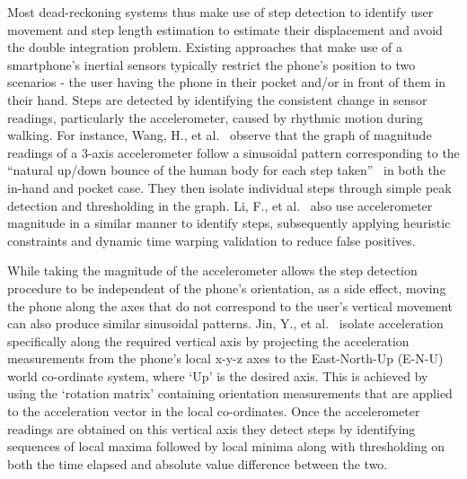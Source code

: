 \documentclass[main.tex]{subfiles}
\begin{document}
Most dead-reckoning systems thus make use of step detection to identify user movement and step length estimation to estimate their displacement and avoid the double integration problem. Existing approaches that make use of a smartphone’s inertial sensors typically restrict the phone’s position to two scenarios - the user having the phone in their pocket and/or in front of them in their hand. Steps are detected by identifying the consistent change in sensor readings, particularly the accelerometer, caused by rhythmic motion during walking. For instance, Wang, H., et al.~\cite{wang2012no} observe that the graph of magnitude readings of a 3-axis accelerometer follow a sinusoidal pattern corresponding to the ``natural up/down bounce of the human body for each step taken''~\cite[p.203]{wang2012no} in both the in-hand and pocket case. They then isolate individual steps through simple peak detection and thresholding in the graph. Li, F., et al.~\cite{li2012reliable} also use accelerometer magnitude in a similar manner to identify steps, subsequently applying heuristic constraints and dynamic time warping validation to reduce false positives.  

While taking the magnitude of the accelerometer allows the step detection procedure to be independent of the phone’s orientation, as a side effect, moving the phone along the axes that do not correspond to the user’s vertical movement can also produce similar sinusoidal patterns. Jin, Y., et al.~\cite{jin2011robust} isolate acceleration specifically along the required vertical axis by projecting the acceleration measurements from the phone’s local x-y-z axes to the East-North-Up (E-N-U) world co-ordinate system, where `Up' is the desired axis.  This is achieved by using the `rotation matrix' containing orientation measurements that are applied to the acceleration vector in the local co-ordinates. Once the accelerometer readings are obtained on this vertical axis they detect steps by identifying sequences of local maxima followed by local minima along with thresholding on both the time elapsed and absolute value difference between the two. 
\end{document}
